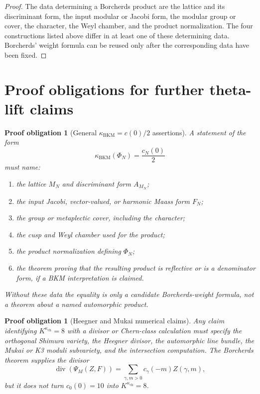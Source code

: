 \documentclass[11pt]{amsart}
\newtheorem{obligation}[theorem]{Proof obligation}
\newcommand{\kch}{\kappa_{\mathrm{ch}}}
\newcommand{\kBKM}{\kappa_{\mathrm{BKM}}}
\newcommand{\divisor}{\operatorname{div}}
\begin{document}
\begin{proof}
The data determining a Borcherds product are the lattice and its
discriminant form, the input modular or Jacobi form, the modular group
or cover, the character, the Weyl chamber, and the product
normalization.  The four constructions listed above differ in at least
one of these determining data.  Borcherds' weight formula can be reused
only after the corresponding data have been fixed.
\end{proof}

\section{Proof obligations for further theta-lift claims}

\begin{obligation}[General \(\kBKM=c(0)/2\) assertions]
\label{obl:general-kBKM}
A statement of the form
\[
 \kBKM(\Phi_N)=\frac{c_N(0)}2
\]
must name:
\begin{enumerate}
\item the lattice \(M_N\) and discriminant form \(A_{M_N}\);
\item the input Jacobi, vector-valued, or harmonic Maass form \(F_N\);
\item the group or metaplectic cover, including the character;
\item the cusp and Weyl chamber used for the product;
\item the product normalization defining \(\Phi_N\);
\item the theorem proving that the resulting product is reflective or
is a denominator form, if a BKM interpretation is claimed.
\end{enumerate}
Without these data the equality is only a candidate Borcherds-weight
formula, not a theorem about a named automorphic product.
\end{obligation}

\begin{obligation}[Heegner and Mukai numerical claims]
\label{obl:heegner-mukai}
Any claim identifying \(K^{\kch}=8\) with a divisor or Chern-class
calculation must specify the orthogonal Shimura variety, the Heegner
divisor, the automorphic line bundle, the Mukai or K3 moduli subvariety,
and the intersection computation.  The Borcherds theorem supplies the
divisor
\[
 \divisor(\Psi_M(Z,F))
 =\sum_{\gamma,m>0} c_\gamma(-m)Z(\gamma,m),
\]
but it does not turn \(c_0(0)=10\) into \(K^{\kch}=8\).
\end{obligation}
\end{document}
